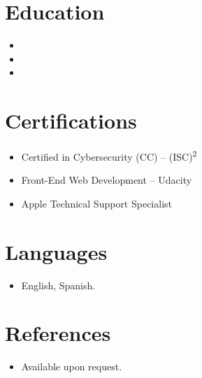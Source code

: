 \documentclass[11pt,a4paper,sans]{moderncv}
\begin{document}

\section{Education}
\vspace{1pt}
\begin{itemize}

\item{}

\vspace{3pt}

\item{}

\vspace{3pt}

\item{}

\end{itemize}


\section{Certifications}
\vspace{1pt}
\begin{itemize}
\item Certified in Cybersecurity (CC) -- (ISC)\textsuperscript{2}
\item Front-End Web Development -- Udacity
\item Apple Technical Support Specialist
\end{itemize}


\section{Languages}
\vspace{1pt}
\begin{itemize}
\item English, Spanish.
\end{itemize}


\section{References}
\vspace{1pt}
\begin{itemize}
\item{Available upon request.}
\end{itemize}
\end{document}
